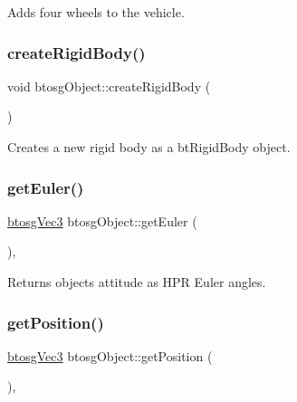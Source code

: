 Adds four wheels to the vehicle. \mbox{\label{classbtosgObject_a029dbe9134fa94e7355799f67fb2cd6d}} 
\subsubsection{\texorpdfstring{createRigidBody()}{createRigidBody()}}
{\footnotesize\ttfamily void btosg\+Object\+::create\+Rigid\+Body (\begin{DoxyParamCaption}{ }\end{DoxyParamCaption})\hspace{0.3cm}{\ttfamily [inherited]}}

Creates a new rigid body as a bt\+Rigid\+Body object. \mbox{\label{classbtosgObject_a2019ec63bde02b72600450c7c985e77a}} 
\subsubsection{\texorpdfstring{getEuler()}{getEuler()}}
{\footnotesize\ttfamily \mbox{\hyperlink{classbtosgVec3}{btosg\+Vec3}} btosg\+Object\+::get\+Euler (\begin{DoxyParamCaption}{ }\end{DoxyParamCaption})\hspace{0.3cm}{\ttfamily [inline]}, {\ttfamily [inherited]}}

Returns object\textquotesingle{}s attitude as H\+PR Euler angles. \mbox{\label{classbtosgObject_a3dadd5da8f2a312e44a039446b93d4cd}} 
\subsubsection{\texorpdfstring{getPosition()}{getPosition()}}
{\footnotesize\ttfamily \mbox{\hyperlink{classbtosgVec3}{btosg\+Vec3}} btosg\+Object\+::get\+Position (\begin{DoxyParamCaption}{ }\end{DoxyParamCaption})\hspace{0.3cm}{\ttfamily [inline]}, {\ttfamily [inherited]}}

